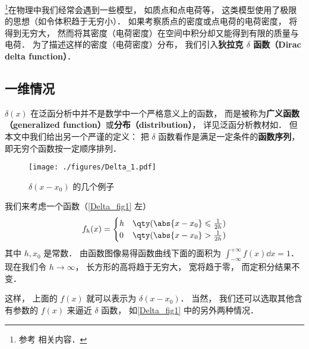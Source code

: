 
\begin{issues}
\issueTODO
\end{issues}

\footnote{参考 \cite{Arfken} 相关内容．}在物理中我们经常会遇到一些模型， 如质点和点电荷等， 这类模型使用了极限的思想（如令体积趋于无穷小）． 如果考察质点的密度或点电荷的电荷密度， 将得到无穷大， 然而将其密度（电荷密度）在空间中积分却又能得到有限的质量与电荷． 为了描述这样的密度（电荷密度）分布， 我们引入\textbf{狄拉克 $\delta$ 函数（Dirac delta function）}．

\subsection{一维情况}

$\delta(x)$ 在泛函分析中并不是数学中一个严格意义上的函数， 而是被称为\textbf{广义函数（generalized function）}或\textbf{分布（distribution）}， 详见泛函分析教材如\cite{Zeidler}． 但本文中我们给出另一个严谨的定义： 把 $\delta$ 函数看作是满足一定条件的\textbf{函数序列}， 即无穷个函数按一定顺序排列．

\begin{figure}[ht]
\centering
\texttt{[image: ./figures/Delta\_1.pdf]}
\caption{$\delta(x - x_0)$ 的几个例子} \label{Delta_fig1}
\end{figure}

我们来考虑一个函数（\autoref{Delta_fig1} 左）
\begin{equation}\label{Delta_eq6}
f_h(x) =
\begin{cases}
h & \qty( \abs{x - x_0} \leqslant \frac{1}{2h} )\\
0 & \qty( \abs{x - x_0} > \frac{1}{2h} )
\end{cases}
\end{equation}
其中 $h, x_0$ 是常数． 由函数图像易得函数曲线下面的面积为 $\int_{-\infty}^{+\infty} f(x) \dd{x} = 1$． 现在我们令 $h \to \infty$， 长方形的高将趋于无穷大， 宽将趋于零， 而定积分结果不变．

这样， 上面的 $f(x)$ 就可以表示为 $\delta(x - x_0)$． 当然， 我们还可以选取其他含有参数的 $f(x)$ 来逼近 $\delta$ 函数， 如\autoref{Delta_fig1} 中的另外两种情况．

